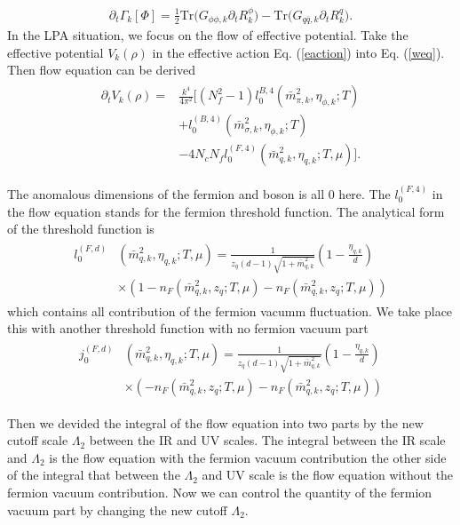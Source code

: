 \documentclass[%
reprint,
superscriptaddress,
showpacs,preprintnumbers,
 amsmath,amssymb,
 aps,
prd,
]{revtex4-1}
\begin{document}
\begin{align}
\partial_t \Gamma_k[\Phi]=\frac{1}{2}\mathrm{Tr}\big(G_{\phi\phi,k}\partial_t R^\phi_k\big)-\mathrm{Tr}\big(G_{q\bar{q},k}\partial_t R^q_k\big).
\label{weq}
\end{align}
 In the LPA situation, we focus on the flow of effective potential. Take the effective potential $V_k(\rho)$ in the effective action Eq. (\ref{eaction}) into Eq. (\ref{weq}). Then flow equation can be derived
\begin{align}
\begin{split}
   \partial_t V_k(\rho)=&\frac{k^4}{4\pi^2}\big[(N^2_f-1)l^{B,4}_{0}(\bar{m}^2_{\pi,k},\eta_{\phi,k};T)\\
   &+l^{(B,4)}_{0}(\bar{m}^2_{\sigma,k},\eta_{\phi,k};T)\\
   &-4N_cN_fl^{(F,4)}_{0}(\bar{m}^2_{q,k},\eta_{q,k};T,\mu)\big].
\end{split}
\end{align}
\par The anomalous dimensions of the fermion and boson is all 0 here. The $l^{(F,4)}_{0}$ in the flow equation stands for the fermion threshold function. The analytical form of the threshold function is 
\begin{align}
\begin{split}
l^{(F,d)}_{0}&(\bar{m}^2_{q,k},\eta_{q,k};T,\mu)=\frac{1}{z_q(d-1)\sqrt{1+\bar{m}^2_{q,k}}}(1-\frac{\eta_{q,k}}{d})\\
&\times(1-n_F(\bar{m}^2_{q,k},z_q;T,\mu)-n_F(\bar{m}^2_{q,k},z_q;T,\mu))
\end{split}
\end{align}
which contains all contribution of the fermion vacumm fluctuation. We take place this with another threshold function with no fermion vacuum part 
\begin{align}
\begin{split}
j^{(F,d)}_{0}&(\bar{m}^2_{q,k},\eta_{q,k};T,\mu)=\frac{1}{z_q(d-1)\sqrt{1+\bar{m}^2_{q,k}}}(1-\frac{\eta_{q,k}}{d})\\
&\times(-n_F(\bar{m}^2_{q,k},z_q;T,\mu)-n_F(\bar{m}^2_{q,k},z_q;T,\mu))
\end{split}
\end{align}
\par Then we devided the integral of the flow equation into two parts by the new cutoff scale $\Lambda_2$ between the IR and UV scales. The integral between the IR scale and $\Lambda_2$ is the flow equation with the fermion vacuum contribution the other side of the integral that between the $\Lambda_2$ and UV scale is the flow equation without the fermion vacuum contribution. Now we can control the quantity of the fermion vacuum part by changing the new cutoff $\Lambda_2$.
\end{document}
